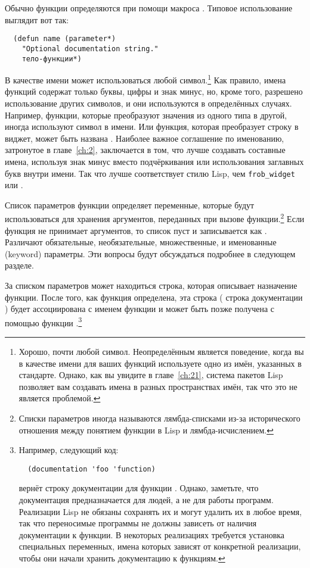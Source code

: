 Обычно функции определяются при помощи макроса .  Типовое использование
 выглядит вот так:

\begin{lstlisting}
  (defun name (parameter*)
    "Optional documentation string."
    тело-функции*)
\end{lstlisting}

В качестве имени может использоваться любой символ.\footnote{Хорошо, почти любой символ.
  Неопределённым является поведение, когда вы в качестве имени для ваших функций
  используете одно из имён, указанных в стандарте.  Однако, как вы увидите в главе~\ref{ch:21},
  система пакетов Lisp позволяет вам создавать имена в разных пространствах имён, так что
  это не является проблемой.}  Как правило, имена функций содержат только буквы, цифры и
знак минус, но, кроме того, разрешено использование других символов, и они используются в
определённых случаях.  Например, функции, которые преобразуют значения из одного типа в
другой, иногда используют символ \code{->} в имени. Или функция, которая преобразует
строку в виджет, может быть названа .  Наиболее важное соглашение по
именованию, затронутое в главе~\ref{ch:2}, заключается в том, что лучше создавать составные имена,
используя знак минус вместо подчёркивания или использования заглавных букв внутри имени.
Так что  лучше соответствует стилю Lisp, чем \lstinline!frob_widget! или
.

Список параметров функции определяет переменные, которые будут использоваться для хранения
аргументов, переданных при вызове функции.\footnote{Списки параметров иногда называются
  лямбда-списками из-за исторического отношения между понятием функции в Lisp и
  лямбда-исчислением.}  Если функция не принимает аргументов, то список пуст и
записывается как \code{()}. Различают обязательные, необязательные, множественные, и
именованные (keyword) параметры.  Эти вопросы будут обсуждаться подробнее в следующем
разделе.

За списком параметров может находиться строка, которая описывает назначение функции.
После того, как функция определена, эта строка ( строка документации ) будет ассоциирована
с именем функции и может быть позже получена с помощью функции
.\footnote{Например, следующий код:

\begin{lstlisting}
  (documentation 'foo 'function)
\end{lstlisting}

вернёт строку документации для функции .  Однако, заметьте, что документация
предназначается для людей, а не для работы программ.  Реализации Lisp не обязаны сохранять
их и могут удалить их в любое время, так что переносимые программы не должны
зависеть от наличия документации к функции.  В некоторых реализациях требуется установка
специальных переменных, имена которых зависят от конкретной реализации, чтобы они начали
хранить документацию к функциям.}

